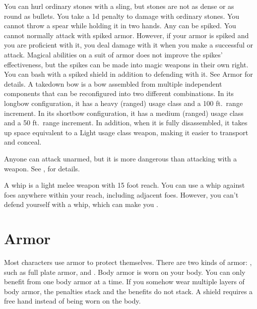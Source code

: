         \par You can hurl ordinary stones with a sling, but stones are not as dense or as round as bullets. You take a \minus1d penalty to damage with ordinary stones.
         You cannot throw a spear while holding it in two hands.
         Any  can be spiked.
        You cannot normally attack with spiked armor.
        However, if your armor is spiked and you are proficient with it, you deal damage with it when you make a successful  or  attack.
        Magical abilities on a suit of armor does not improve the spikes' effectiveness, but the spikes can be made into magic weapons in their own right.
         You can bash with a spiked shield in addition to defending with it. See Armor for details.
         A takedown bow is a bow assembled from multiple independent components that can be reconfigured into two different combinations.
        In its longbow configuration, it has a heavy (ranged) usage class and a 100 ft.\ range increment.
        In its shortbow configuration, it has a medium (ranged) usage class and a 50 ft.\ range increment.
        In addition, when it is fully disassembled, it takes up space equivalent to a Light usage class weapon, making it easier to transport and conceal.

         Anyone can attack unarmed, but it is more dangerous than attacking with a weapon. See , for details.

         A whip is a light melee weapon with 15 foot reach.
        You can use a whip against foes anywhere within your reach, including adjacent foes.
        However, you can't defend yourself with a whip, which can make you .

\section{Armor}\label{Armor}

    Most characters use armor to protect themselves. There are two kinds of armor: , such as full plate armor, and .
    Body armor is worn on your body.
    You can only benefit from one body armor at a time.
    If you somehow wear multiple layers of body armor, the penalties stack and the benefits do not stack.
    A shield requires a free hand instead of being worn on the body.

